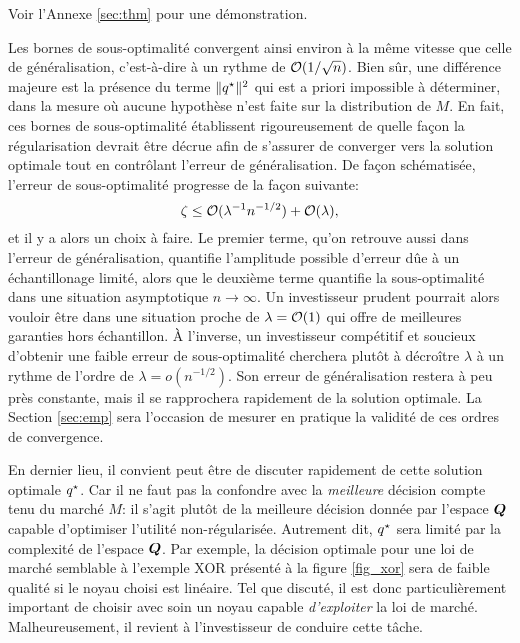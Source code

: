Voir l'Annexe \ref{sec:thm} pour une démonstration. 

Les bornes de sous-optimalité convergent ainsi environ à la même vitesse que celle de
généralisation, c'est-à-dire à un rythme de $\mathcal O(1/\sqrt{n})$. Bien sûr, une différence
majeure est la présence du terme $\|q^\star\|^2$ qui est a priori impossible à déterminer,
dans la mesure où aucune hypothèse n'est faite sur la distribution de $M$.  En fait, ces
bornes de sous-optimalité établissent rigoureusement de quelle façon la régularisation
devrait être décrue afin de s'assurer de converger vers la solution optimale tout en
contrôlant l'erreur de généralisation. De façon schématisée, l'erreur de sous-optimalité
progresse de la façon suivante:
\begin{equation}
  \zeta \leq \mathcal O(\lambda^{-1}n^{-1/2}) + \mathcal O(\lambda),
\end{equation}
et il y a alors un choix à faire. Le premier terme, qu'on retrouve aussi dans l'erreur de
généralisation, quantifie l'amplitude possible d'erreur dûe à un échantillonage limité,
alors que le deuxième terme quantifie la sous-optimalité dans une situation asymptotique
$n \to \infty$. Un investisseur prudent pourrait alors vouloir être dans une situation proche de
$\lambda = \mathcal O(1)$ qui offre de meilleures garanties hors échantillon. À l'inverse, un
investisseur compétitif et soucieux d'obtenir une faible erreur de sous-optimalité
cherchera plutôt à décroître $\lambda$ à un rythme de l'ordre de $\lambda = o(n^{-1/2})$. Son erreur
de généralisation restera à peu près constante, mais il se rapprochera rapidement de la
solution optimale. La Section \ref{sec:emp} sera l'occasion de mesurer en pratique la
validité de ces ordres de convergence.

En dernier lieu, il convient peut être de discuter rapidement de cette solution optimale
$q^\star$. Car il ne faut pas la confondre avec la \textit{meilleure} décision compte tenu du
marché $M$: il s'agit plutôt de la meilleure décision donnée par l'espace $\bm Q$ capable
d'optimiser l'utilité non-régularisée. Autrement dit, $q^\star$ sera limité par la complexité
de l'espace $\bm Q$. Par exemple, la décision optimale pour une loi de marché semblable à
l'exemple XOR présenté à la figure \ref{fig_xor} sera de faible qualité si le noyau choisi
est linéaire. Tel que discuté, il est donc particulièrement important de choisir avec soin
un noyau capable \textit{d'exploiter} la loi de marché. Malheureusement, il revient à
l'investisseur de conduire cette tâche.





